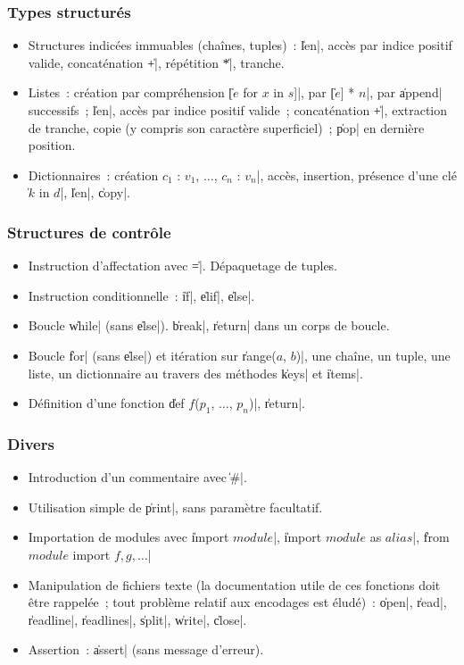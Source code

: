 \subsubsection*{Types structurés}
\begin{itemize}
\item Structures indicées immuables (chaînes, tuples)~: \|len|, accès par indice positif valide, concaténation \|+|, répétition \|*|, tranche.
\item Listes~: création par compréhension \|[$e$ for $x$ in $s$]|, par \|[$e$] * $n$|, par \|append| successifs~; \|len|, accès par indice positif valide~; concaténation \|+|, extraction de tranche, copie (y compris son caractère superficiel)~; \|pop| en dernière position.
\item Dictionnaires~: création \|{$c_1$ : $v_1$, $\dots$, $c_n$ : $v_n$}|, accès, insertion, présence d'une clé \|$k$ in $d$|, \|len|, \|copy|.
\end{itemize}

\subsubsection*{Structures de contrôle}
\begin{itemize}
\item Instruction d'affectation avec \|=|. Dépaquetage de tuples.
\item Instruction conditionnelle~: \|if|, \|elif|, \|else|.
\item Boucle \|while| (sans \|else|). \|break|, \|return| dans un corps de boucle.
\item Boucle \|for| (sans \|else|) et itération sur \|range($a$, $b$)|, une chaîne, un tuple, une liste, un dictionnaire au travers des méthodes \|keys| et \|items|.
\item Définition d'une fonction \|def $f$($p_1$, $…$, $p_n$)|, \|return|.
\end{itemize}

\subsubsection*{Divers}
\begin{itemize}
\item Introduction d'un commentaire avec \|#|.
\item Utilisation simple de \|print|, sans paramètre facultatif.
\item Importation de modules avec \|import $\mathit{module}$|, \|import $\mathit{module}$ as $\mathit{alias}$|, \|from $\mathit{module}$ import $f, g, \ldots$|
\item Manipulation de fichiers texte (la documentation utile de ces fonctions doit être rappelée~; tout problème relatif aux encodages est éludé)~: \|open|, \|read|, \|readline|, \|readlines|, \|split|, \|write|, \|close|.
\item Assertion~: \|assert| (sans message d'erreur).
\end{itemize}
